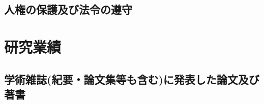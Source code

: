 \documentclass[11pt,a4paper,uplatex,twoside,dvipdfmx]{ujarticle} 	%
\renewcommand{\bf}{\bfseries\sffamily\gtfamily}
\newcommand{\研究課題名}{\mgfamily ストカスティックインフレーション, 原始ブラックホール, および重力波観測}
\newcommand{\研究機関名}{\mgfamily 名古屋大学}
\newcommand{\申請者氏名}{\mgfamily 多田 祐一郎}
\newcommand{\研究代表者氏名}{\申請者氏名}
\newcommand{\研究期間の最終元号年度}{34}	%
\begin{document}
\subsection{人権の保護及び法令の遵守}
\newcommand{\人権の保護及び法令等の遵守への対応}{%
	本研究は該当しない.
}

\section{研究業績}
\renewcommand{\応募者の研究遂行能力}{%
	応募者は過去20年間、７つの海を隅から隅まで航海し、
	浅瀬から深海まで潜り、文字通り東西南北上下の３次元で
	シロナガスクジラの卵の探索を行ってきた。
	シロナガスクジラに飲み込まれそうになったり、海賊に捕まるなどの危険な目にも
	あったが、それにもめげず、研究を遂行してきた強靭な能力を有する。
}

\subsection{学術雑誌(紀要・論文集等も含む)に発表した論文及び著書}
\newcommand{\学術雑誌等に発表した論文または著書}{%
	
	\begin{enumerate}
		\item[](査読有り)%
		\item \underline{H. Yukawa}$^1$, J. Kara$^2$,
				``Theory of Elephant Eggs'', 
				Phys.\ Rev.\ Lett. {\bf 800}, 800-804 (2005). 
				\label{pub:theoegg}
				
		\item F.~Ehrlich, \underline{H. Yukawa}$^1$,
				``You can't Lay an Egg If You're an Elephant'', 
				JofUR\\
				 ({\tt www.universalrejection.org}), {\bf N/A}, N/A (2002).

		\item[](査読なし)%
		\item Kobo Abe$^3$, \underline{H. Yukawa}$^1$, 
				``仔象は死んだ'', 
				安部公房全集, {\bf 26}, 100-200, (2004).
	\end{enumerate}
	他５報
}
\end{document}

